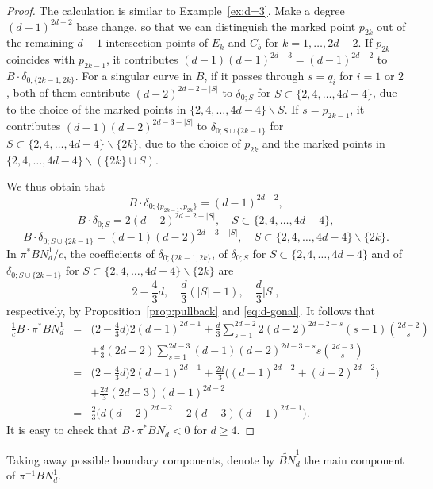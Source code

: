 \documentclass[11]{amsart}
\theoremstyle{plain}
\theoremstyle{definition}
\newcommand{\wt}{\widetilde}
\begin{document}
\begin{proof}
The calculation is similar to Example~\ref{ex:d=3}. Make a degree $(d-1)^{2d-2}$ base change, so that we can distinguish the marked point $p_{2k}$ out of the remaining $d-1$ intersection points of $E_k$ and $C_b$ for $k=1,\ldots, 2d-2$. If 
$p_{2k}$ coincides with $p_{2k-1}$, it contributes $(d-1)(d-1)^{2d-3} = (d-1)^{2d-2}$ 
to $B\cdot \delta_{0; \{2k-1, 2k\}}$. For a singular curve in $B$, if it passes through $s = q_i$ for $i=1$ or $2$, both of them contribute $(d-2)^{2d-2-|S|}$ to $\delta_{0; S}$ for $S\subset \{2,4,\ldots, 4d-4\}$, due to the choice of the marked points in $\{2,4,\ldots, 4d-4\}\backslash S$. If $s = p_{2k-1}$, it contributes 
$(d-1)(d-2)^{2d-3-|S|}$ 
to $\delta_{0;S\cup \{2k-1\}}$ for $S\subset \{2,4,\ldots, 4d-4\} \backslash \{ 2k\}$, due to the choice of $p_{2k}$ and the 
 marked points in $\{2,4,\ldots, 4d-4\} \backslash (\{ 2k\}\cup S)$. 

We thus obtain that
$$ B\cdot \delta_{0;\{p_{2k-1}, p_{2k}\}} = (d-1)^{2d-2}, $$
$$ B\cdot \delta_{0;S} = 2(d-2)^{2d-2-|S|}, \quad S\subset \{2,4,\ldots,4d-4\}, $$
$$ B\cdot \delta_{0;S\cup \{2k-1\}} = (d-1)(d-2)^{2d-3-|S|}, \quad S\subset \{2,4,\ldots, 4d-4\}\backslash\{2k\}. $$
In $\pi^{*}BN^1_d/c$, the coefficients of $\delta_{0;\{2k-1, 2k\}}$, of $\delta_{0;S}$ for 
$S\subset \{2,4,\ldots,4d-4\}$ and of $\delta_{0;S\cup \{2k-1\}}$ for $S\subset \{2,4,\ldots, 4d-4\}\backslash\{2k\}$ 
are 
$$ 2 - \frac{4}{3}d,  \quad \frac{d}{3} (|S|-1), \quad \frac{d}{3} |S|, $$
respectively, by Proposition~\ref{prop:pullback} and \eqref{eq:d-gonal}. It follows that 
\begin{eqnarray*}
 \frac{1}{c}B\cdot \pi^{*}BN^1_d & = & \Big(2-\frac{4}{3}d\Big) 2(d-1)^{2d-1}  + \frac{d}{3} \sum_{s=1}^{2d-2} 2(d-2)^{2d-2-s}(s-1){2d-2 \choose s} \\
& &  + \frac{d}{3}(2d-2) \sum_{s=1}^{2d-3} (d-1)(d-2)^{2d-3-s}s{2d-3\choose s} \\
& = &  \Big(2-\frac{4}{3}d\Big) 2 (d-1)^{2d-1} + \frac{2d}{3}\Big((d-1)^{2d-2} + (d-2)^{2d-2}\Big) \\
& & + \frac{2d}{3} (2d-3)(d-1)^{2d-2} \\
& = & \frac{2}{3}\Big( d(d-2)^{2d-2} - 2 (d-3)(d-1)^{2d-1} \Big). 
\end{eqnarray*}
It is easy to check that $B\cdot \pi^{*}BN^1_d < 0$ for $d \geq 4$. 
\end{proof}

Taking away possible boundary components, denote by $\wt{BN}^1_d$ the main component of $\pi^{-1}BN^1_d$. 
\end{document}
